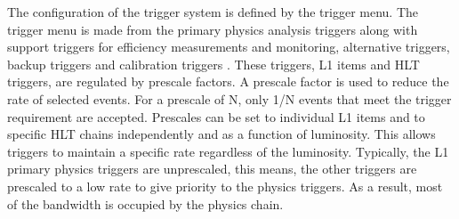 \indent The configuration of the trigger system is defined by the trigger menu. The trigger menu is made from the primary physics analysis triggers along with support triggers for efficiency measurements and monitoring, alternative triggers, backup triggers and calibration triggers \cite{zurNedden:2238679}. These triggers, L1 items and HLT triggers, are regulated by prescale factors. A prescale factor is used to reduce the rate of selected events. For a prescale of N, only 1/N events that meet the trigger requirement are accepted. Prescales can be set to individual L1 items and to specific HLT chains independently and as a function of luminosity. This allows triggers to maintain a specific rate regardless of the luminosity. Typically, the L1 primary physics triggers are unprescaled, this means, the other triggers are prescaled to a low rate to give priority to the physics triggers. As a result, most of the bandwidth is occupied by the physics chain. \newline


